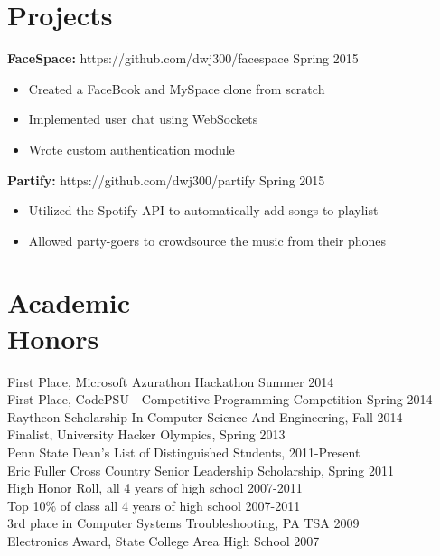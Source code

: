 \documentclass[margin]{res}
\begin{document}
\begin{resume}
\section{Projects}
{\bf FaceSpace:} https://github.com/dwj300/facespace \hfill Spring 2015
\begin{itemize} \itemsep -2pt %
\item Created a FaceBook and MySpace clone from scratch
\item Implemented user chat using WebSockets
\item Wrote custom authentication module
\end{itemize}
{\bf Partify:} https://github.com/dwj300/partify \hfill Spring 2015     
\begin{itemize} \itemsep -2pt %
\item Utilized the Spotify API to automatically add songs to playlist
\item Allowed party-goers to crowdsource the music from their phones
\end{itemize}

\section{Academic \\ Honors}
First Place, Microsoft Azurathon Hackathon \hfill Summer 2014\\
First Place, CodePSU - Competitive Programming Competition  \hfill Spring 2014\\
Raytheon Scholarship In Computer Science And Engineering, \hfill Fall 2014\\
Finalist, University Hacker Olympics, \hfill Spring 2013\\
Penn State Dean's List of Distinguished Students, \hfill 2011-Present \\
Eric Fuller Cross Country Senior Leadership Scholarship, \hfill Spring 2011 \\
High Honor Roll, all 4 years of high school \hfill 2007-2011 \\
Top 10\% of class all 4 years of high school \hfill 2007-2011 \\
3rd place in Computer Systems Troubleshooting, PA TSA \hfill 2009 \\
Electronics Award, State College Area High School \hfill 2007


\end{resume}
\end{document}
